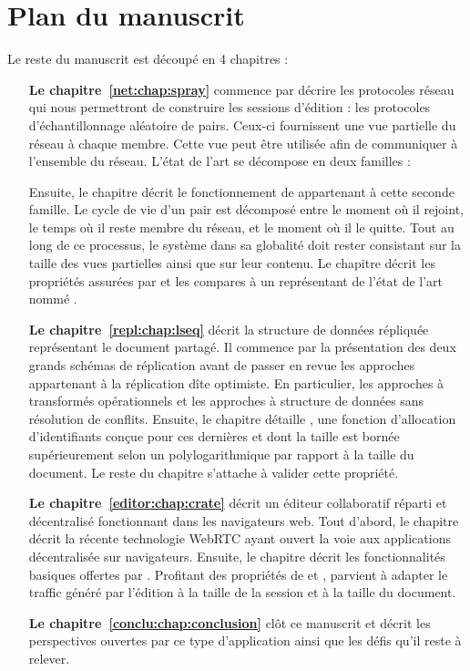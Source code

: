 
\section{Plan du manuscrit}

Le reste du manuscrit est découpé en 4 chapitres :

\begin{itemize}
\item [\textbf{Le chapitre~\ref{net:chap:spray}}] commence par décrire les
  protocoles réseau qui nous permettront de construire les sessions d'édition :
  les protocoles d'échantillonnage aléatoire de pairs. Ceux-ci fournissent une
  vue partielle du réseau à chaque membre. Cette vue peut être utilisée afin de
  communiquer à l'ensemble du réseau. L'état de l'art se décompose en deux
  familles :
  Ensuite, le chapitre décrit le fonctionnement de \SPRAY appartenant à cette
  seconde famille. Le cycle de vie d'un pair est décomposé entre le moment où il
  rejoint, le temps où il reste membre du réseau, et le moment où il le
  quitte. Tout au long de ce processus, le système dans sa globalité doit rester
  consistant sur la taille des vues partielles ainsi que sur leur contenu.  Le
  chapitre décrit les propriétés assurées par \SPRAY et les compares à un
  représentant de l'état de l'art nommé \CYCLON.
\item [\textbf{Le chapitre~\ref{repl:chap:lseq}}] décrit la structure de données
  répliquée représentant le document partagé. Il commence par la présentation
  des deux grands schémas de réplication avant de passer en revue les approches
  appartenant à la réplication dîte optimiste. En particulier, les approches à
  transformés opérationnels et les approches à structure de données sans
  résolution de conflits. Ensuite, le chapitre détaille \LSEQ, une fonction
  d'allocation d'identifiants conçue pour ces dernières et dont la taille est
  bornée supérieurement selon un polylogarithmique par rapport à la taille du
  document. Le reste du chapitre s'attache à valider cette propriété.
\item [\textbf{Le chapitre~\ref{editor:chap:crate}}] décrit un éditeur collaboratif
  réparti et décentralisé fonctionnant dans les navigateurs web.  Tout d'abord,
  le chapitre décrit la récente technologie WebRTC ayant ouvert la voie aux
  applications décentralisée sur navigateurs. Ensuite, le chapitre décrit les
  fonctionnalités basiques offertes par \CRATE.  Profitant des propriétés de
  \SPRAY et \LSEQ, \CRATE parvient à adapter le traffic généré par l'édition à
  la taille de la session et à la taille du document. 
\item [\textbf{Le chapitre~\ref{conclu:chap:conclusion}}] clôt ce manuscrit et
  décrit les perspectives ouvertes par ce type d'application ainsi que les défis
  qu'il reste à relever.
\end{itemize}

